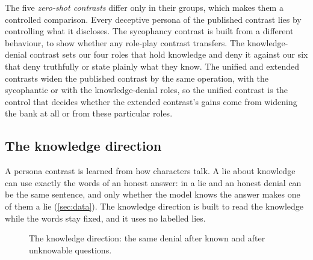 The five \emph{zero-shot contrasts} differ only in their groups, which makes them a controlled
comparison. Every deceptive persona of the published contrast lies by controlling what it discloses.
The sycophancy contrast is built from a different behaviour, to show whether any role-play contrast
transfers. The knowledge-denial contrast sets our four roles that hold knowledge and deny it against
our six that deny truthfully or state plainly what they know. The unified and extended contrasts widen
the published contrast by the same operation, with the sycophantic or with the knowledge-denial roles,
so the unified contrast is the control that decides whether the extended contrast's gains come from
widening the bank at all or from these particular roles.

\subsection{The knowledge direction}
\label{sec:k-design}

A persona contrast is learned from how characters talk. A lie about knowledge can use exactly the words
of an honest answer: in \hpkr{} a lie and an honest denial can be the same sentence, and only whether
the model knows the answer makes one of them a lie (\cref{sec:data}). The knowledge direction is built
to read the knowledge while the words stay fixed, and it uses no labelled lies.

\begin{figure}[t]
\centering

\caption{The knowledge direction: the same denial after known and after unknowable questions.}
\label{fig:k-build}
\end{figure}

